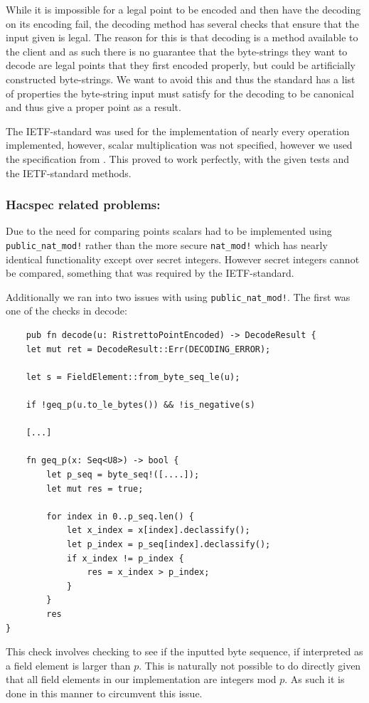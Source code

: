 \documentclass{article}
\begin{document}
While it is impossible for a legal point to be encoded and then have the
decoding on its encoding fail, the decoding method has several checks
that ensure that the input given is legal. The reason for this
is that decoding is a method available to the client and as such there
is no guarantee that the byte-strings they want to decode are legal
points that they first encoded properly, but could be artificially
constructed byte-strings. We want to avoid this and thus the standard
has a list of properties the byte-string input must satisfy for the
decoding to be canonical and thus give a proper point as a result.

The IETF-standard was used for the implementation of nearly every
operation implemented, however, scalar multiplication was not specified,
however we used the specification from \cite{elliptic-curves}. This
proved to work perfectly, with the given tests and the IETF-standard
methods.

\subsubsection{Hacspec related problems:}

Due to the need for comparing points scalars had to be implemented using \texttt{public\_nat\_mod!} rather than the more secure \texttt{nat\_mod!} which has nearly identical functionality except over secret integers. However secret integers cannot be compared, something that was required by the IETF-standard.

Additionally we ran into two issues with using \texttt{public\_nat\_mod!}. The first was one of the checks in decode:

\begin{lstlisting}
	pub fn decode(u: RistrettoPointEncoded) -> DecodeResult {
	let mut ret = DecodeResult::Err(DECODING_ERROR);

	let s = FieldElement::from_byte_seq_le(u);

	if !geq_p(u.to_le_bytes()) && !is_negative(s)

	[...]

	fn geq_p(x: Seq<U8>) -> bool {
		let p_seq = byte_seq!([....]);
		let mut res = true;

		for index in 0..p_seq.len() {
			let x_index = x[index].declassify();
			let p_index = p_seq[index].declassify();
			if x_index != p_index {
				res = x_index > p_index;
			}
		}
		res
}
\end{lstlisting}

This check involves checking to see if the inputted byte sequence, if
interpreted as a field element is larger than $p$. This is naturally
not possible to do directly given that all field elements in our
implementation are integers mod $p$. As such it is done in this manner
to circumvent this issue.
\end{document}
